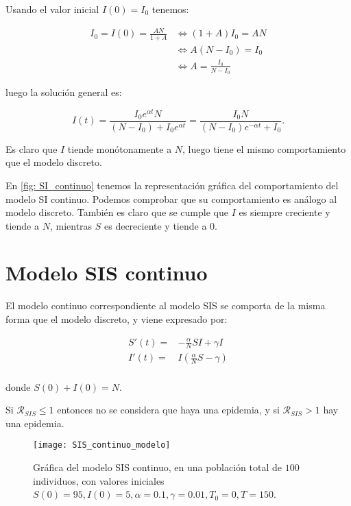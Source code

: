 Usando el valor inicial $I(0)=I_0$ tenemos:

\begin{equation}
\begin{aligned}
I_0 = I(0) = \frac{AN}{1+A} & \Leftrightarrow (1+A)I_0 = AN \\
& \Leftrightarrow A(N-I_0) = I_0 \\
& \Leftrightarrow A = \frac{I_0}{N-I_0}
\end {aligned}
\end{equation}

luego la solución general es:

$$I(t) = \frac{I_0e^{\alpha t}N}{(N-I_0)+I_0e^{\alpha t}} = \frac{I_0N}{(N-I_0)e^{-\alpha t}+I_0}.$$

Es claro que $I$ tiende monótonamente a $N$, luego tiene el mismo comportamiento que el modelo discreto.

En \eqref{fig: SI_continuo} tenemos la representación gráfica del comportamiento del modelo SI continuo. Podemos comprobar que su comportamiento es análogo al modelo discreto. También es claro que se cumple que $I$ es siempre creciente y tiende a $N$, mientras $S$ es decreciente y tiende a $0$.

\section{Modelo SIS continuo}

El modelo continuo correspondiente al modelo SIS se comporta de la misma forma que el modelo discreto, y viene expresado por:

\begin{equation}
\label{eqn: modelo_SIS_continuo}
\begin{aligned}
S'(t) = & -\frac{\alpha}{N}SI+\gamma I \\
I'(t) = & I\left( \frac{\alpha}{N}S-\gamma \right) \\
\end{aligned}
\end{equation}

donde $S(0)+I(0)=N$.

Si $\mathcal{R}_{SIS}\leq 1$ entonces no se considera que haya una epidemia, y si $\mathcal{R}_{SIS} > 1$ hay una epidemia.

\begin{figure}
\begin{center}
\caption{Gráfica del modelo SIS continuo, en una población total de $100$ individuos, con valores iniciales $S(0)=95, I(0) = 5, \alpha = 0.1, \gamma = 0.01, T_0 = 0, T = 150$.}
\label{fig: SIS_continuo}
\texttt{[image: SIS\_continuo\_modelo]}
\end{center}
\end{figure}

